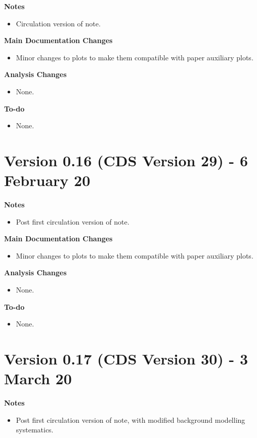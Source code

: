 \documentclass[NOTE, atlasdraft=true, texlive=2017, UKenglish]{\ATLASLATEXPATH atlasdoc}
\begin{document}
\textbf{Notes}
\begin{itemize}
\item Circulation version of note.
\end{itemize}

\textbf{Main Documentation Changes}
\begin{itemize}
\item Minor changes to plots to make them compatible with paper auxiliary plots.
\end{itemize}

\textbf{Analysis Changes}
\begin{itemize}
\item None.
\end{itemize}

\textbf{To-do}
\begin{itemize}
\item None.
\end{itemize}


\section*{Version 0.16 (CDS Version 29) - 6 February 20}

\textbf{Notes}
\begin{itemize}
\item Post first circulation version of note.
\end{itemize}

\textbf{Main Documentation Changes}
\begin{itemize}
\item Minor changes to plots to make them compatible with paper auxiliary plots.
\end{itemize}

\textbf{Analysis Changes}
\begin{itemize}
\item None.
\end{itemize}

\textbf{To-do}
\begin{itemize}
\item None.
\end{itemize}


\section*{Version 0.17 (CDS Version 30) - 3 March 20}

\textbf{Notes}
\begin{itemize}
\item Post first circulation version of note, with modified background modelling systematics.
\end{itemize}
\end{document}
